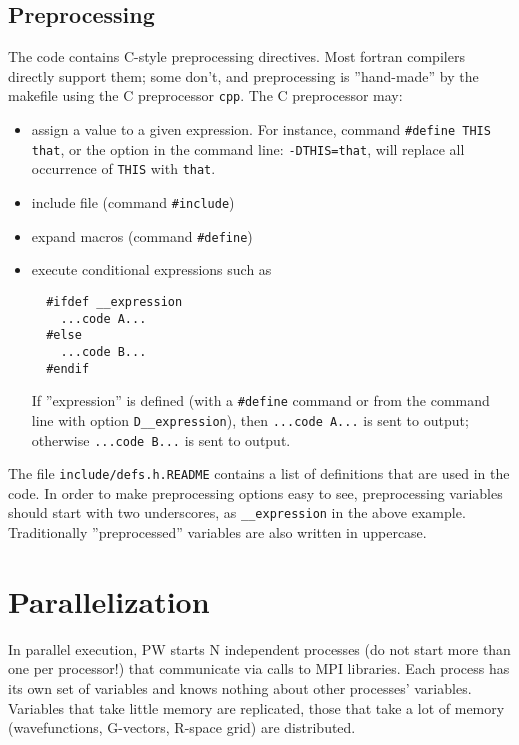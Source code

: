 \documentclass[12pt,a4paper]{article}
\begin{document}
\subsection{Preprocessing}
\label{SubSec:CPP}
The code contains C-style preprocessing directives. Most fortran compilers directly support them; some don't, and preprocessing is ''hand-made'' by the makefile using the C preprocessor \texttt{cpp}. The C preprocessor may:
\begin{itemize}
\item assign a value to a given expression. For instance, command \texttt{\#define THIS that}, or the option in the command line: \texttt{-DTHIS=that}, will replace all occurrence of \texttt{THIS} with \texttt{that}.
\item include file (command \texttt{\#include})
\item expand macros (command \texttt{\#define})
\item execute conditional expressions such as
\begin{verbatim}
  #ifdef __expression
    ...code A...
  #else
    ...code B...
  #endif
\end{verbatim}
If ''expression'' is defined (with a \texttt{\#define} command 
or from the command line with option \texttt{\-D\_\_expression}), 
then  \texttt{...code A...} is sent to output; otherwise 
\texttt{...code B...} is sent to output.

\end{itemize}
The file \texttt{include/defs.h.README} contains a list of definitions that are used in the code. In order to make  preprocessing options easy to see, preprocessing variables should start with 
two underscores, as \texttt{\_\_expression} in the above example. Traditionally ''preprocessed'' variables are also written in uppercase.


\section{ Parallelization}

In parallel execution, PW starts N independent processes (do not start more than one per processor!) that communicate via calls to MPI libraries. Each process has its own set of variables and knows nothing about other processes' variables. Variables that take little memory are replicated, those that take a lot of memory (wavefunctions, G-vectors, R-space grid) are distributed.
    
\end{document}
